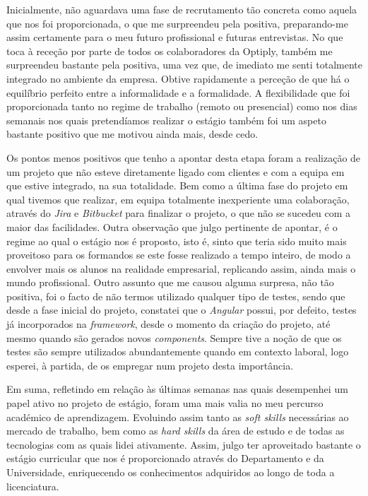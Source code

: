 \documentclass{article}
\begin{document}
\hspace*{0.5cm} Inicialmente, não aguardava uma fase de recrutamento tão concreta como aquela que nos foi proporcionada, o que me surpreendeu pela positiva, preparando-me assim certamente para o meu futuro profissional e futuras entrevistas. \newline
\hspace*{0.5cm} No que toca à receção por parte de todos os colaboradores da Optiply, também me surpreendeu bastante pela positiva, uma vez que, de imediato me senti totalmente integrado no ambiente da empresa. Obtive rapidamente a perceção de que há o equilíbrio perfeito entre a informalidade e a formalidade. A flexibilidade que foi proporcionada tanto no regime de trabalho (remoto ou presencial) como nos dias semanais nos quais pretendíamos realizar o estágio também foi um aspeto bastante positivo que me motivou ainda mais, desde cedo. \newline

\hspace*{0.5cm} Os pontos menos positivos que tenho a apontar desta etapa foram a realização de um projeto que não esteve diretamente ligado com clientes e com a equipa em que estive integrado, na sua totalidade. Bem como a última fase do projeto em qual tivemos que realizar, em equipa totalmente inexperiente uma colaboração, através do \emph{Jira} e \emph{Bitbucket} para finalizar o projeto, o que não se sucedeu com a maior das facilidades. Outra observação que julgo pertinente de apontar, é o regime ao qual o estágio nos é proposto, isto é, sinto que teria sido muito mais proveitoso para os formandos se este fosse realizado a tempo inteiro, de modo a envolver mais os alunos na realidade empresarial, replicando assim, ainda mais o mundo profissional. \newline
\hspace*{0.5cm} Outro assunto que me causou alguma surpresa, não tão positiva, foi o facto de não termos utilizado qualquer tipo de testes, sendo que desde a fase inicial do projeto, constatei que o \emph{Angular} possui, por defeito, testes já incorporados na \emph{framework}, desde o momento da criação do projeto, até mesmo quando são gerados novos \emph{components}. Sempre tive a noção de que os testes são sempre utilizados abundantemente quando em contexto laboral, logo esperei, à partida, de os empregar num projeto desta importância.

\hspace*{0.5cm} Em suma, refletindo em relação às últimas semanas nas quais desempenhei um papel ativo no projeto de estágio, foram uma mais valia no meu percurso académico de aprendizagem. Evoluindo assim tanto as \emph{soft skills} necessárias ao mercado de trabalho, bem como as \emph{hard skills} da área de estudo e de todas as tecnologias com as quais lidei ativamente. Assim, julgo ter aproveitado bastante o estágio curricular que nos é proporcionado através do Departamento e da Universidade, enriquecendo os conhecimentos adquiridos ao longo de toda a licenciatura.

\cleardoublepage


\label{referencias}
\end{document}
